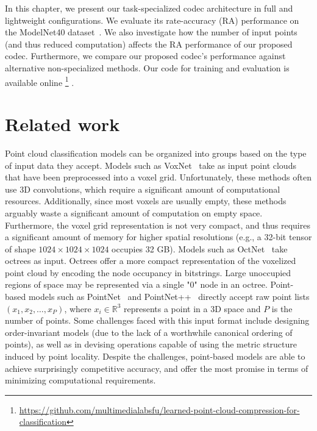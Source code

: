 In this chapter, we present our task-specialized codec architecture in full and lightweight configurations.
We evaluate its rate-accuracy (RA) performance on the ModelNet40 dataset~\cite{wu20143d}.
We also investigate how the number of input points (and thus reduced computation) affects the RA performance of our proposed codec.
Furthermore, we compare our proposed codec's performance against alternative non-specialized methods.
Our code for training and evaluation is available online%
\footnote{%
  \hfill%
  \url{https://github.com/multimedialabsfu/learned-point-cloud-compression-for-classification}%
}%
.




\section{Related work}
\label{sec:related-work}

Point cloud classification models can be organized into groups based on the type of input data they accept.
Models such as VoxNet~\cite{maturana2015voxnet} take as input point clouds that have been preprocessed into a voxel grid.
Unfortunately, these methods often use 3D convolutions, which require a significant amount of computational resources.
Additionally, since most voxels are usually empty, these methods arguably waste a significant amount of computation on empty space.
Furthermore, the voxel grid representation is not very compact, and thus requires a significant amount of memory for higher spatial resolutions (e.g., a 32-bit tensor of shape $1024 \times 1024 \times 1024$ occupies 32 GB).
Models such as OctNet~\cite{riegler2016octnet} take octrees as input.
Octrees offer a more compact representation of the voxelized point cloud by encoding the node occupancy in bitstrings.
Large unoccupied regions of space may be represented via a single "0" node in an octree.
Point-based models such as PointNet~\cite{qi2016pointnet} and PointNet++~\cite{qi2017pointnetplusplus} directly accept raw point lists $(x_1, x_2, \ldots, x_P)$, where $x_i \in \mathbb{R}^3$ represents a point in a 3D space and $P$ is the number of points.
Some challenges faced with this input format include designing order-invariant models (due to the lack of a worthwhile canonical ordering of points),
as well as in devising operations capable of using the metric structure induced by point locality.
Despite the challenges, point-based models are able to achieve surprisingly competitive accuracy,
and offer the most promise in terms of minimizing computational requirements.

